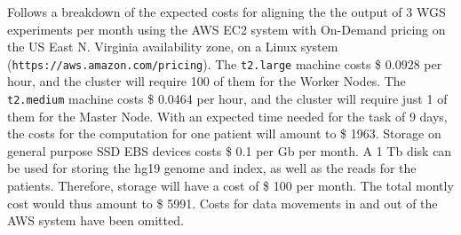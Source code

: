 \documentclass{article}
\begin{document}
Follows a breakdown of the expected costs for aligning the the output of 3 WGS experiments per month using the AWS EC2 system with On-Demand pricing on the US East N. Virginia availability zone, on a Linux system (\texttt{https://aws.amazon.com/pricing}).
The \texttt{t2.large} machine costs \$ 0.0928 per hour, and the cluster will require 100 of them for the Worker Nodes.
The \texttt{t2.medium} machine costs \$ 0.0464 per hour, and the cluster will require just 1 of them for the Master Node.
With an expected time needed for the task of 9 days, the costs for the computation for one patient will amount to \$ 1963.
Storage on general purpose SSD EBS devices costs \$ 0.1 per Gb per month.
A 1 Tb disk can be used for storing the hg19 genome and index, as well as the reads for the patients.
Therefore, storage will have a cost of \$ 100 per month.
The total montly cost would thus amount to \$ 5991.
Costs for data movements in and out of the AWS system have been omitted.
\end{document}
